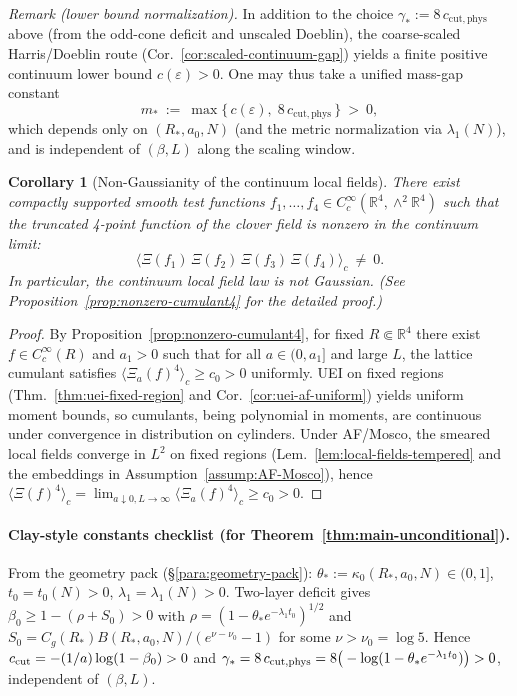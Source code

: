 \documentclass[11pt]{amsart}
\theoremstyle{plain}
\newtheorem{corollary}[theorem]{Corollary}
\theoremstyle{definition}
\theoremstyle{remark}
\begin{document}
\noindent\emph{Remark (lower bound normalization).} In addition to the choice $\gamma_*:=8\,c_{\mathrm{cut,phys}}$ above (from the odd-cone deficit and unscaled Doeblin), the coarse-scaled Harris/Doeblin route (Cor.~\ref{cor:scaled-continuum-gap}) yields a finite positive continuum lower bound $c(\varepsilon)>0$. One may thus take a unified mass-gap constant
\[
  m_*\ :=\ \max\{\,c(\varepsilon),\; 8\,c_{\mathrm{cut,phys}}\,\}\ >\ 0,
\]
which depends only on $(R_*,a_0,N)$ (and the metric normalization via $\lambda_1(N)$), and is independent of $(\beta,L)$ along the scaling window.
\begin{corollary}[Non-Gaussianity of the continuum local fields]\label{cor:nonGaussian-main}
There exist compactly supported smooth test functions $f_1,\ldots,f_4\in C_c^\infty(\mathbb R^4,\wedge^2\mathbb R^4)$ such that the truncated 4-point function of the clover field is nonzero in the continuum limit:
\[
  \langle \Xi(f_1)\,\Xi(f_2)\,\Xi(f_3)\,\Xi(f_4)\rangle_c\ \neq\ 0.
\]
In particular, the continuum local field law is not Gaussian. (See Proposition~\ref{prop:nonzero-cumulant4} for the detailed proof.)
\end{corollary}
\begin{proof}
By Proposition~\ref{prop:nonzero-cumulant4}, for fixed $R\Subset\mathbb R^4$ there exist $f\in C_c^\infty(R)$ and $a_1>0$ such that for all $a\in(0,a_1]$ and large $L$, the lattice cumulant satisfies $\langle \Xi_a(f)^4\rangle_c\ge c_0>0$ uniformly. UEI on fixed regions (Thm.~\ref{thm:uei-fixed-region} and Cor.~\ref{cor:uei-af-uniform}) yields uniform moment bounds, so cumulants, being polynomial in moments, are continuous under convergence in distribution on cylinders. Under AF/Mosco, the smeared local fields converge in $L^2$ on fixed regions (Lem.~\ref{lem:local-fields-tempered} and the embeddings in Assumption~\ref{assump:AF-Mosco}), hence $\langle \Xi(f)^4\rangle_c=\lim_{a\downarrow 0,L\to\infty}\langle \Xi_a(f)^4\rangle_c\ge c_0>0$.
\end{proof}

\paragraph{Clay-style constants checklist (for Theorem~\ref{thm:main-unconditional}).}
From the geometry pack (\S\ref{para:geometry-pack}): $\theta_*:=\kappa_0(R_*,a_0,N)\in(0,1]$, $t_0=t_0(N)>0$, $\lambda_1=\lambda_1(N)>0$. Two-layer deficit gives $\beta_0\ge 1-(\rho+S_0)>0$ with $\rho=(1-\theta_* e^{-\lambda_1 t_0})^{1/2}$ and $S_0= C_g(R_*) B(R_*,a_0,N)/(e^{\nu-\nu_0}-1)$ for some $\nu>\nu_0=\log 5$. Hence $c_{\rm cut}=-(1/a)\log(1-\beta_0)>0$ and $\gamma_*=8\,c_{\rm cut,phys}=8\big(-\log(1-\theta_* e^{-\lambda_1 t_0})\big)>0$, independent of $(\beta,L)$.
\end{document}

